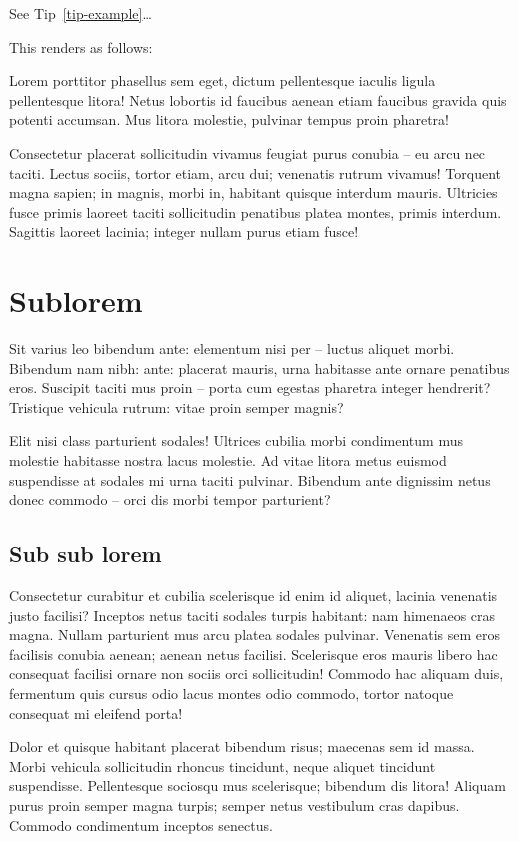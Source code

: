 \documentclass[
  brazilian,
  11pt,
  a4paper,
  open = right,
  twoside = true]{scrbook}
\begin{document}
See Tip~\ref{tip-example}\ldots{}

This renders as follows:

Lorem porttitor phasellus sem eget, dictum pellentesque iaculis ligula
pellentesque litora! Netus lobortis id faucibus aenean etiam faucibus
gravida quis potenti accumsan. Mus litora molestie, pulvinar tempus
proin pharetra!

Consectetur placerat sollicitudin vivamus feugiat purus conubia -- eu
arcu nec taciti. Lectus sociis, tortor etiam, arcu dui; venenatis rutrum
vivamus! Torquent magna sapien; in magnis, morbi in, habitant quisque
interdum mauris. Ultricies fusce primis laoreet taciti sollicitudin
penatibus platea montes, primis interdum. Sagittis laoreet lacinia;
integer nullam purus etiam fusce!

\section{Sublorem}\label{sublorem}

Sit varius leo bibendum ante: elementum nisi per -- luctus aliquet
morbi. Bibendum nam nibh: ante: placerat mauris, urna habitasse ante
ornare penatibus eros. Suscipit taciti mus proin -- porta cum egestas
pharetra integer hendrerit? Tristique vehicula rutrum: vitae proin
semper magnis?

Elit nisi class parturient sodales! Ultrices cubilia morbi
condimentum mus molestie habitasse nostra lacus molestie. Ad vitae
litora metus euismod suspendisse at sodales mi urna taciti pulvinar.
Bibendum ante dignissim netus donec commodo -- orci dis morbi tempor
parturient?

\subsection{Sub sub lorem}\label{sub-sub-lorem}

Consectetur curabitur et cubilia scelerisque id enim id aliquet, lacinia
venenatis justo facilisi? Inceptos netus taciti sodales turpis habitant:
nam himenaeos cras magna. Nullam parturient mus arcu platea sodales
pulvinar. Venenatis sem eros facilisis conubia aenean; aenean netus
facilisi. Scelerisque eros mauris libero hac consequat facilisi ornare
non sociis orci sollicitudin! Commodo hac aliquam duis, fermentum quis
cursus odio lacus montes odio commodo, tortor natoque consequat mi
eleifend porta!

Dolor et quisque habitant placerat bibendum risus; maecenas sem id
massa. Morbi vehicula sollicitudin rhoncus tincidunt, neque aliquet
tincidunt suspendisse. Pellentesque sociosqu mus scelerisque; bibendum
dis litora! Aliquam purus proin semper magna turpis; semper netus
vestibulum cras dapibus. Commodo condimentum inceptos
senectus.
\end{document}
